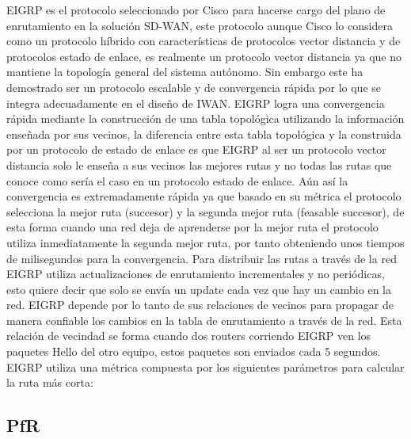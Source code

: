 EIGRP es el protocolo seleccionado por Cisco para hacerse cargo del plano de enrutamiento en la solución SD-WAN, este protocolo aunque Cisco lo considera como un protocolo híbrido con características de protocolos vector distancia y de protocolos estado de enlace, es realmente un protocolo vector distancia ya que no mantiene la topología general del sistema autónomo. Sin embargo este ha demostrado ser un protocolo escalable y de convergencia rápida por lo que se integra adecuadamente en el diseño de IWAN.
EIGRP logra una convergencia rápida mediante la construcción de una tabla topológica utilizando la información enseñada por sus vecinos, la diferencia entre esta tabla topológica y la construida por un protocolo de estado de enlace es que  EIGRP al ser un protocolo vector distancia solo le enseña a sus vecinos las mejores rutas y no todas las rutas que conoce como sería el caso en un protocolo estado de enlace. Aún así la convergencia es extremadamente rápida ya que basado en su métrica el protocolo selecciona la mejor ruta (succesor) y la segunda mejor ruta (feasable succesor), de esta forma cuando una red deja de aprenderse por la mejor ruta el protocolo utiliza inmediatamente la segunda mejor ruta, por tanto obteniendo unos tiempos de milisegundos para la convergencia.
Para distribuir las rutas a través de la red EIGRP utiliza actualizaciones de enrutamiento incrementales y no periódicas, esto quiere decir que solo se envía un update cada vez que hay un cambio en la red. EIGRP depende por lo tanto de sus relaciones de vecinos para propagar de manera confiable los cambios en la tabla de enrutamiento a través de la red. Esta relación de vecindad se forma cuando dos routers corriendo EIGRP ven los paquetes Hello del otro equipo, estos paquetes son enviados cada 5 segundos.
EIGRP utiliza una métrica compuesta por los siguientes parámetros para calcular la ruta más corta:

\subsection{PfR}
\label{sec:PfR}

